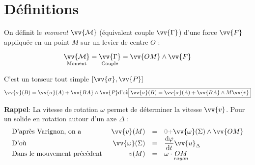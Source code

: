 \documentclass[11pt,a4paper,fleqn,pdftex]{report}
\begin{document}
\section{Définitions}
\begin{dfn}
On définit le \emph{moment} $\vv{\mathcal{M}}$ (équivalent couple $\vv{\Gamma}$) d'une force $\vv{F}$ appliquée en un point $M$ sur un levier de centre $O$ :\\
%
\hspace{1.5\oddsidemargin}\begin{minipage}[c]{0.4\textwidth}
	\begin{equation}
	\underset{\text{Moment}}{\vv{\mathcal{M}}}=\underset{\text{Couple}}{\vv{\Gamma}}=\vv{OM}\wedge\vv{F}
	\end{equation}
\end{minipage}\hspace{0.1\textwidth}
\begin{minipage}[c]{0.3\textwidth}
\end{minipage}
%
\end{dfn}
\begin{dfn}
C'est un torseur tout simple $\left[\vv{\sigma},\vv{P}\right]$
\begin{equation}
\vv{\sigma}(B)=\vv{\sigma}(A)+\vv{BA}\wedge\vv{P}\\ \text{d'où} \\
\boxed{\vv{\sigma}(B)=\vv{\sigma}(A)+\vv{BA}\wedge{}M\vv{v}}
\end{equation}
\end{dfn}
\textbf{Rappel}: La vitesse de rotation $\omega$ permet de déterminer la vitesse $\vv{v}$. Pour un solide en rotation autour d'un axe $\Delta$ : 
$$
\begin{array}{l r c l}
\text{D'après Varignon, on a }&\vv{v}(M)&=& \textcolor{gray}{0}\textcolor{gray}{+}\vv{\omega}(\Sigma)\wedge\vv{OM}\\
\text{D'où }&\vv{\omega}(\Sigma)&=&\der{\varphi}{t}\vv{u}_\Delta\\
\text{Dans le mouvement précédent }&v(M)&=&\omega\cdot\underset{rayon}{OM}
\end{array}
$$
\end{document}
